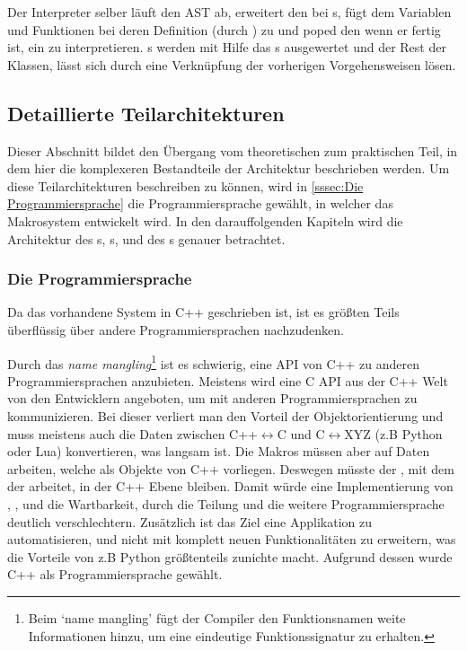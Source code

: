       Der Interpreter selber läuft den AST ab, erweitert den  bei s, fügt dem  Variablen und Funktionen bei deren Definition (durch ) zu und poped den  wenn er fertig ist, ein  zu interpretieren. s werden mit Hilfe das s ausgewertet und der Rest der  Klassen, lässt sich durch eine Verknüpfung der vorherigen Vorgehensweisen lösen.

  \subsection{Detaillierte Teilarchitekturen}
  \label{ssec:Detaillierte Teilarchitekturen}
    Dieser Abschnitt bildet den Übergang vom theoretischen zum praktischen Teil, in dem hier die komplexeren Bestandteile der Architektur beschrieben werden. Um diese Teilarchitekturen beschreiben zu können, wird in \autoref{sssec:Die Programmiersprache} die Programmiersprache gewählt, in welcher das Makrosystem entwickelt wird. In den darauffolgenden Kapiteln wird die Architektur des s, s,  und des s genauer betrachtet.

    \subsubsection{Die Programmiersprache}
    \label{sssec:Die Programmiersprache}
      Da das vorhandene System in C++ geschrieben ist, ist es größten Teils überflüssig über andere Programmiersprachen nachzudenken.

      Durch das \emph{name mangling}\footnote{
        Beim `name mangling' fügt der Compiler den Funktionsnamen weite Informationen hinzu, um eine eindeutige Funktionssignatur zu erhalten.
      } ist es schwierig, eine API von C++ zu anderen Programmiersprachen anzubieten. Meistens wird eine C API aus der C++ Welt von den Entwicklern angeboten, um mit anderen Programmiersprachen zu kommunizieren. Bei dieser verliert man den Vorteil der Objektorientierung und muss meistens auch die Daten zwischen C++$\longleftrightarrow$C und C$\longleftrightarrow$XYZ (z.B Python oder Lua) konvertieren, was langsam ist. Die Makros müssen aber auf Daten arbeiten, welche als Objekte von C++ vorliegen. Deswegen müsste der , mit dem der  arbeitet, in der C++ Ebene bleiben. Damit würde eine Implementierung von , ,  und  die Wartbarkeit, durch die Teilung und die weitere Programmiersprache deutlich verschlechtern. Zusätzlich ist das Ziel eine Applikation zu automatisieren, und nicht mit komplett neuen Funktionalitäten zu erweitern, was die Vorteile von z.B Python größtenteils zunichte macht. Aufgrund dessen wurde C++ als Programmiersprache gewählt.

